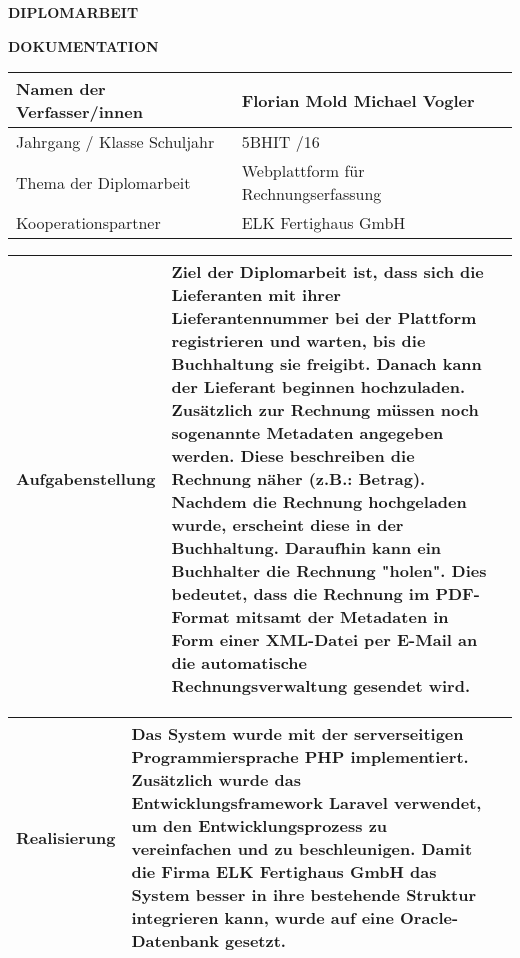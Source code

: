\begin{center}
\textbf{\LARGE DIPLOMARBEIT}

\textbf{DOKUMENTATION}
\end{center}

\begin{tabular}{|p{53mm}|p{110mm}|@{}m{0cm}@{}}
\hline
Namen der \newline Verfasser/innen & Florian Mold \newline Michael Vogler & \\ [0.3cm]
\hline
Jahrgang / Klasse \newline Schuljahr & 5BHIT \newline 2015/16 & \\ [0.3cm]
\hline
Thema der Diplomarbeit & Webplattform für Rechnungserfassung & \\ [0.3cm]
\hline
Kooperationspartner & ELK Fertighaus GmbH & \\ [0.3cm]
\hline
\end{tabular}

\vspace{0.5cm}

\begin{tabular}{|p{53mm}|p{110mm}|@{}m{0cm}@{}}
\hline
Aufgabenstellung & Ziel der Diplomarbeit ist, dass sich die Lieferanten mit ihrer Lieferantennummer bei der Plattform registrieren und warten, bis die Buchhaltung sie freigibt. Danach kann der Lieferant beginnen hochzuladen. Zusätzlich zur Rechnung müssen noch sogenannte Metadaten angegeben werden. Diese beschreiben die Rechnung näher (z.B.: Betrag). Nachdem die Rechnung hochgeladen wurde, erscheint diese in der Buchhaltung. Daraufhin kann ein Buchhalter die Rechnung "holen". Dies bedeutet, dass die Rechnung im PDF-Format mitsamt der Metadaten in Form einer XML-Datei per E-Mail an die automatische Rechnungsverwaltung gesendet wird.  & \\ 
\hline
\end{tabular}

\vspace{0.5cm}

\begin{tabular}{|p{53mm}|p{110mm}|@{}m{0cm}@{}}
\hline
Realisierung & Das System wurde mit der serverseitigen Programmiersprache PHP implementiert. Zusätzlich wurde das Entwicklungsframework Laravel verwendet, um den Entwicklungsprozess zu vereinfachen und zu beschleunigen. Damit die Firma ELK Fertighaus GmbH das System besser in ihre bestehende Struktur integrieren kann, wurde auf eine Oracle-Datenbank gesetzt.  & \\ 
\hline
\end{tabular}

